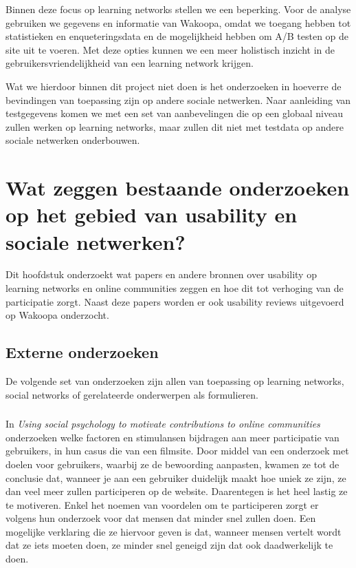 \documentclass[a4paper, 10pt, pdftex]{report}
\begin{document}
    Binnen deze focus op learning networks stellen we een beperking. Voor de analyse gebruiken we gegevens en informatie van Wakoopa, omdat we toegang hebben tot statistieken en enqueteringsdata en de mogelijkheid hebben om A/B testen op de site uit te voeren. Met deze opties kunnen we een meer holistisch inzicht in de gebruikersvriendelijkheid van een learning network krijgen.

    Wat we hierdoor binnen dit project niet doen is het onderzoeken in hoeverre de bevindingen van toepassing zijn op andere sociale netwerken. Naar aanleiding van testgegevens komen we met een set van aanbevelingen die op een globaal niveau zullen werken op learning networks, maar zullen dit niet met testdata op andere sociale netwerken onderbouwen.

  \newpage
  \chapter{Wat zeggen bestaande onderzoeken op het gebied van usability en sociale netwerken?}
    \label{researchchapter}
    \newpage

    Dit hoofdstuk onderzoekt wat papers en andere bronnen over usability op learning networks en online communities zeggen en hoe dit tot verhoging van de participatie zorgt. Naast deze papers worden er ook usability reviews uitgevoerd op Wakoopa onderzocht.


    \section{Externe onderzoeken}
      De volgende set van onderzoeken zijn allen van toepassing op learning networks, social networks of gerelateerde onderwerpen als formulieren.
      \subsection{\cite{Beenen2004}}

      In \emph{Using social psychology to motivate contributions to online communities} onderzoeken \citeauthor{Beenen2004} welke factoren en stimulansen bijdragen aan meer participatie van gebruikers, in hun casus die van een filmsite. Door middel van een onderzoek met doelen voor gebruikers, waarbij ze de bewoording aanpasten, kwamen ze tot de conclusie dat, wanneer je aan een gebruiker duidelijk maakt hoe uniek ze zijn, ze dan veel meer zullen participeren op de website. Daarentegen is het heel lastig ze te motiveren. Enkel het noemen van voordelen om te participeren zorgt er volgens hun onderzoek voor dat mensen dat minder snel zullen doen. Een mogelijke verklaring die ze hiervoor geven is dat, wanneer mensen vertelt wordt dat ze iets moeten doen, ze minder snel geneigd zijn dat ook daadwerkelijk te doen.
\end{document}
